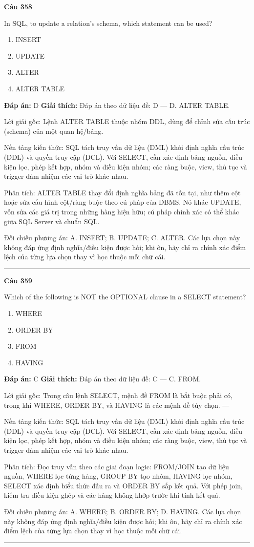 \documentclass[11pt,a4paper]{article}
\newenvironment{question}[1]{%
  \par\vspace{1em}\noindent\textbf{\large Câu #1}\par\vspace{0.4em}
}{%
  \par\vspace{1em}\hrule\vspace{0.6em}
}
\newenvironment{choices}{%
  \begin{enumerate}[label=\textbf{\Alph*.},leftmargin=2.2em,itemsep=2pt,topsep=3pt]
}{%
  \end{enumerate}
}
\newcommand{\choice}{\item}
\begin{document}
\begin{question}{358}
In SQL, to update a relation's schema, which statement can be used?
\begin{choices}
\choice INSERT
\choice UPDATE
\choice ALTER
\choice ALTER TABLE
\end{choices}
\textbf{Đáp án:} D
\textbf{Giải thích:} Đáp án theo dữ liệu đề: D — D. ALTER TABLE.

Lời giải gốc: Lệnh ALTER TABLE thuộc nhóm DDL, dùng để chỉnh sửa cấu trúc (schema) của một quan hệ/bảng.

Nền tảng kiến thức: SQL tách truy vấn dữ liệu (DML) khỏi định nghĩa cấu trúc (DDL) và quyền truy cập (DCL). Với SELECT, cần xác định bảng nguồn, điều kiện lọc, phép kết hợp, nhóm và điều kiện nhóm; các ràng buộc, view, thủ tục và trigger đảm nhiệm các vai trò khác nhau.

Phân tích: ALTER TABLE thay đổi định nghĩa bảng đã tồn tại, như thêm cột hoặc sửa cấu hình cột/ràng buộc theo cú pháp của DBMS. Nó khác UPDATE, vốn sửa các giá trị trong những hàng hiện hữu; cú pháp chính xác có thể khác giữa SQL Server và chuẩn SQL.

Đối chiếu phương án: A. INSERT; B. UPDATE; C. ALTER. Các lựa chọn này không đáp ứng định nghĩa/điều kiện được hỏi; khi ôn, hãy chỉ ra chính xác điểm lệch của từng lựa chọn thay vì học thuộc mỗi chữ cái.
\end{question}

\begin{question}{359}
Which of the following is NOT the OPTIONAL clause in a SELECT statement?
\begin{choices}
\choice WHERE
\choice ORDER BY
\choice FROM
\choice HAVING
\end{choices}
\textbf{Đáp án:} C
\textbf{Giải thích:} Đáp án theo dữ liệu đề: C — C. FROM.

Lời giải gốc: Trong câu lệnh SELECT, mệnh đề FROM là bắt buộc phải có, trong khi WHERE, ORDER BY, và HAVING là các mệnh đề tùy chọn. ---

Nền tảng kiến thức: SQL tách truy vấn dữ liệu (DML) khỏi định nghĩa cấu trúc (DDL) và quyền truy cập (DCL). Với SELECT, cần xác định bảng nguồn, điều kiện lọc, phép kết hợp, nhóm và điều kiện nhóm; các ràng buộc, view, thủ tục và trigger đảm nhiệm các vai trò khác nhau.

Phân tích: Đọc truy vấn theo các giai đoạn logic: FROM/JOIN tạo dữ liệu nguồn, WHERE lọc từng hàng, GROUP BY tạo nhóm, HAVING lọc nhóm, SELECT xác định biểu thức đầu ra và ORDER BY sắp kết quả. Với phép join, kiểm tra điều kiện ghép và các hàng không khớp trước khi tính kết quả.

Đối chiếu phương án: A. WHERE; B. ORDER BY; D. HAVING. Các lựa chọn này không đáp ứng định nghĩa/điều kiện được hỏi; khi ôn, hãy chỉ ra chính xác điểm lệch của từng lựa chọn thay vì học thuộc mỗi chữ cái.
\end{question}
\end{document}

